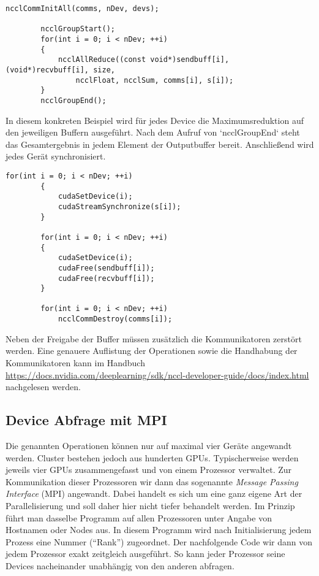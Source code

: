		\begin{lstlisting}[caption=NCCL: Multi-Device Reduktion]
		ncclCommInitAll(comms, nDev, devs);

		ncclGroupStart();
		for(int i = 0; i < nDev; ++i)
		{
			ncclAllReduce((const void*)sendbuff[i], (void*)recvbuff[i], size, 
				ncclFloat, ncclSum, comms[i], s[i]);
		}
		ncclGroupEnd();
		\end{lstlisting}
	
		In diesem konkreten Beispiel wird für jedes Device die Maximumsreduktion auf den jeweiligen Buffern ausgeführt. Nach dem Aufruf von \li`ncclGroupEnd` steht das Gesamtergebnis in jedem Element der Outputbuffer bereit. Anschließend wird jedes Gerät synchronisiert.
		
		\newpage
	 
		\begin{lstlisting}[caption=NCCL: Synchronisation und Cleanup]
		for(int i = 0; i < nDev; ++i) 
		{
			cudaSetDevice(i);
			cudaStreamSynchronize(s[i]);
		}

		for(int i = 0; i < nDev; ++i) 
		{
			cudaSetDevice(i);
			cudaFree(sendbuff[i]);
			cudaFree(recvbuff[i]);
		}

		for(int i = 0; i < nDev; ++i)
			ncclCommDestroy(comms[i]);
		\end{lstlisting}    
	
		Neben der Freigabe der Buffer müssen zusätzlich die Kommunikatoren zerstört werden. Eine genauere Auflistung der Operationen sowie die Handhabung der Kommunikatoren kann im Handbuch {\small \url{https://docs.nvidia.com/deeplearning/sdk/nccl-developer-guide/docs/index.html}}\\ nachgelesen werden.
	
		\subsection{Device Abfrage mit MPI}
		Die genannten Operationen können nur auf maximal vier Geräte angewandt werden. Cluster bestehen jedoch aus hunderten GPUs. Typischerweise werden jeweils vier GPUs zusammengefasst und von einem Prozessor verwaltet. Zur Kommunikation dieser Prozessoren wir dann das sogenannte \textit{Message Passing Interface} (MPI) angewandt. Dabei handelt es sich um eine ganz eigene Art der Parallelisierung und soll daher hier nicht tiefer behandelt werden. Im Prinzip führt man dasselbe Programm auf allen Prozessoren unter Angabe von Hostnamen oder Nodes aus. In diesem Programm wird nach Initialisierung jedem Prozess eine Nummer (\enquote{Rank}) zugeordnet. Der nachfolgende Code wir dann von jedem Prozessor exakt zeitgleich ausgeführt. So kann jeder Prozessor seine Devices nacheinander unabhängig von den anderen abfragen.
		
